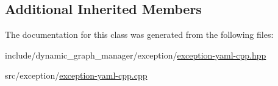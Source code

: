 \subsection*{Additional Inherited Members}


The documentation for this class was generated from the following files\+:\begin{DoxyCompactItemize}
\item 
include/dynamic\+\_\+graph\+\_\+manager/exception/\hyperlink{exception-yaml-cpp_8hpp}{exception-\/yaml-\/cpp.\+hpp}\item 
src/exception/\hyperlink{exception-yaml-cpp_8cpp}{exception-\/yaml-\/cpp.\+cpp}\end{DoxyCompactItemize}
